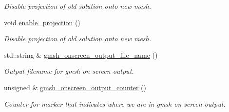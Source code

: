 \begin{DoxyCompactItemize}
\begin{DoxyCompactList}\small\item\em Disable projection of old solution onto new mesh. \end{DoxyCompactList}\item 
void \hyperlink{classoomph_1_1GmshParameters_afa3a44a5a06632733efa49912a272865}{enable\+\_\+projection} ()
\begin{DoxyCompactList}\small\item\em Disable projection of old solution onto new mesh. \end{DoxyCompactList}\item 
std\+::string \& \hyperlink{classoomph_1_1GmshParameters_ac712c282aec129e50646e6cf07a7a92e}{gmsh\+\_\+onscreen\+\_\+output\+\_\+file\+\_\+name} ()
\begin{DoxyCompactList}\small\item\em Output filename for gmsh on-\/screen output. \end{DoxyCompactList}\item 
unsigned \& \hyperlink{classoomph_1_1GmshParameters_afde31eadaa2ca1862837624f68ea8d34}{gmsh\+\_\+onscreen\+\_\+output\+\_\+counter} ()
\begin{DoxyCompactList}\small\item\em Counter for marker that indicates where we are in gmsh on-\/screen output. \end{DoxyCompactList}\end{DoxyCompactItemize}
